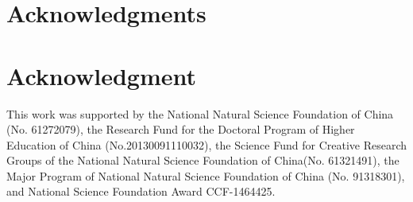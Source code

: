 \documentclass[10pt,journal,compsoc]{IEEEtran}
\begin{document}
%


\appendices
%


\ifCLASSOPTIONcompsoc
  \section*{Acknowledgments}
\else
  \section*{Acknowledgment}
\fi


This work was supported by the National Natural Science Foundation of China (No. 61272079), the Research Fund for the Doctoral Program of Higher Education of China (No.20130091110032), the Science Fund for Creative Research Groups of the National Natural Science Foundation of China(No. 61321491), the Major Program of National Natural Science Foundation of China (No. 91318301), and National Science Foundation Award CCF-1464425.


\ifCLASSOPTIONcaptionsoff
  \newpage
\fi
\end{document}
